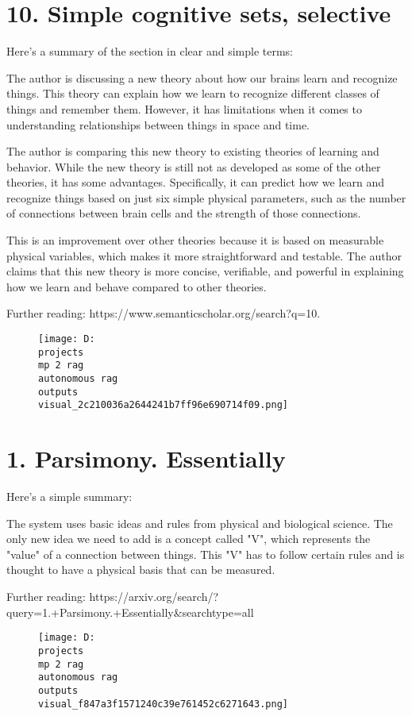 \documentclass[12pt,a4paper]{article}
\begin{document}
\section{10. Simple cognitive sets, selective}
Here's a summary of the section in clear and simple terms:

The author is discussing a new theory about how our brains learn and recognize things. This theory can explain how we learn to recognize different classes of things and remember them. However, it has limitations when it comes to understanding relationships between things in space and time.

The author is comparing this new theory to existing theories of learning and behavior. While the new theory is still not as developed as some of the other theories, it has some advantages. Specifically, it can predict how we learn and recognize things based on just six simple physical parameters, such as the number of connections between brain cells and the strength of those connections.

This is an improvement over other theories because it is based on measurable physical variables, which makes it more straightforward and testable. The author claims that this new theory is more concise, verifiable, and powerful in explaining how we learn and behave compared to other theories.

Further reading: https://www.semanticscholar.org/search?q=10.%
\begin{figure}[h]
\centering
\texttt{[image: D:\\projects\\mp 2 rag\\autonomous rag\\outputs\\visual\_2c210036a2644241b7ff96e690714f09.png]}
\end{figure}
\section{1. Parsimony. Essentially}
Here's a simple summary:

The system uses basic ideas and rules from physical and biological science. The only new idea we need to add is a concept called "V", which represents the "value" of a connection between things. This "V" has to follow certain rules and is thought to have a physical basis that can be measured.

Further reading: https://arxiv.org/search/?query=1.+Parsimony.+Essentially&searchtype=all
\begin{figure}[h]
\centering
\texttt{[image: D:\\projects\\mp 2 rag\\autonomous rag\\outputs\\visual\_f847a3f1571240c39e761452c6271643.png]}
\end{figure}
\end{document}
